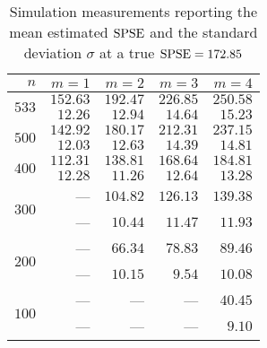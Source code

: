 \begin{table}[htb]
	\center
	\caption{Simulation measurements reporting the mean estimated $\mathrm{SPSE}$ and the standard deviation $\sigma$ at a true $\mathrm{SPSE} = 172.85$}
	\label{tab:sim-res}
	\begin{tabular}{rrrrr}
		\hline
		$n$ & $m=1$ & $m=2$ & $m=3$ & $m=4$ \\
		\hline
		\hline
		\multirow{2}{*}{$533$}
		& $152.63$ & $192.47$ & $226.85$ & $250.58$ \\
		& $12.26$ & $12.94$ & $14.64$ & $15.23$ \\
		\hline
		\multirow{2}{*}{$500$}
		& $142.92$ & $180.17$ & $212.31$ & $237.15$ \\
		& $12.03$ & $12.63$ & $14.39$ & $14.81$ \\
		\hline
		\multirow{2}{*}{$400$}
		& $112.31$ & $138.81$ & $168.64$ & $184.81$ \\
		& $12.28$ & $11.26$ & $12.64$ & $13.28$ \\
		\hline
		\multirow{2}{*}{$300$}
		& --- & $104.82$ & $126.13$ & $139.38$ \\
		& --- & $10.44$ & $11.47$ & $11.93$ \\
		\hline
		\multirow{2}{*}{$200$}
		& --- & $66.34$ & $78.83$ & $89.46$ \\
		& --- & $10.15$ & $9.54$ & $10.08$ \\
		\hline
		\multirow{2}{*}{$100$}
		& --- & --- & --- & $40.45$ \\
		& --- & --- & --- & $9.10$ \\
		\hline
	\end{tabular}
\end{table}